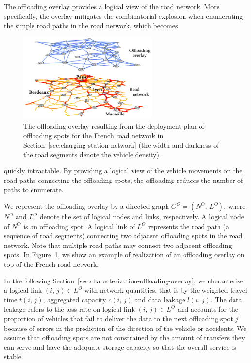 The offloading overlay provides a logical view of the road network. More specifically, the overlay mitigates the combinatorial explosion when enumerating the simple road paths in the road network, which becomes
\begin{figure}
    \includegraphics[width=7cm]{figures/France-overlay-1.pdf}
    \caption{The offloading overlay resulting from the deployment plan of offloading spots for the French road network in Section~\ref{sec:charging-station-network} (the width and darkness of the road segments denote the vehicle density).}
    \label{fig:France-overlay}
\end{figure}
quickly intractable. By providing a logical view of the vehicle movements on the road paths connecting the offloading spots, the offloading reduces the number of paths to enumerate. 

We represent the offloading overlay by a directed graph $G^O=(N^O,\,L^O)$, where $N^{O}$ and $L^{O}$ denote the set of logical nodes and links, respectively. A logical node of $N^{O}$ is an offloading spot. A logical link of $L^{O}$ represents the road path (\ie a sequence of road segments) connecting two adjacent offloading spots in the road network. Note that multiple road paths may connect two adjacent offloading spots. In Figure~\ref{fig:France-overlay}, we show an example of realization of an offloading overlay on top of the French road network. 

In the following Section~\ref{sec:characterization-offloading-overlay}, we characterize a logical link $(i,\,j)\in L^{O}$ with network quantities, that is by the weighted travel time $t(i,\,j)$, aggregated capacity $c(i,\,j)$ and data leakage $l(i,\,j)$. The data leakage refers to the loss rate on logical link $(i,\,j)\in L^{O}$ and accounts for the proportion of vehicles that fail to deliver the data to the next offloading spot $j$ because of errors in the prediction of the direction of the vehicle or accidents. We assume that offloading spots are not constrained by the amount of transfers they can serve and have the adequate storage capacity so that the overall service is stable. 

